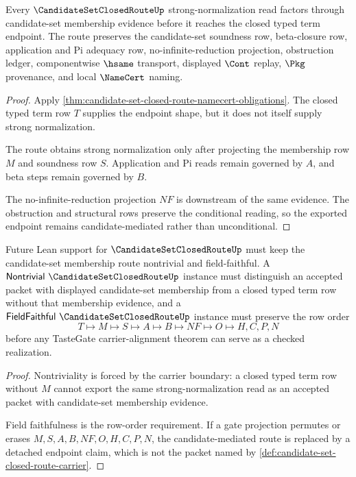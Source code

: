 \begin{theorem}
\label{thm:candidate-set-closed-route-sn}
Every $\CandidateSetClosedRouteUp$ strong-normalization read factors through candidate-set membership evidence before it reaches the closed typed term endpoint. The route preserves the candidate-set soundness row, beta-closure row, application and Pi adequacy row, no-infinite-reduction projection, obstruction ledger, componentwise $\hsame$ transport, displayed $\Cont$ replay, $\Pkg$ provenance, and local $\NameCert$ naming.
\end{theorem}
\begin{proof}
Apply \autoref{thm:candidate-set-closed-route-namecert-obligations}. The closed typed term row $T$ supplies the endpoint shape, but it does not itself supply strong normalization.

The route obtains strong normalization only after projecting the membership row $M$ and soundness row $S$. Application and Pi reads remain governed by $A$, and beta steps remain governed by $B$.

The no-infinite-reduction projection $NF$ is downstream of the same evidence. The obstruction and structural rows preserve the conditional reading, so the exported endpoint remains candidate-mediated rather than unconditional.
\end{proof}

\begin{theorem}
\label{thm:candidate-set-closed-route-tastegate-obligation}
Future Lean support for $\CandidateSetClosedRouteUp$ must keep the candidate-set membership route nontrivial and field-faithful. A $\mathsf{Nontrivial}\ \CandidateSetClosedRouteUp$ instance must distinguish an accepted packet with displayed candidate-set membership from a closed typed term row without that membership evidence, and a $\mathsf{FieldFaithful}\ \CandidateSetClosedRouteUp$ instance must preserve the row order
$$
T \longmapsto M \longmapsto S \longmapsto A \longmapsto B \longmapsto NF \longmapsto O \longmapsto H,C,P,N
$$
before any TasteGate carrier-alignment theorem can serve as a checked realization.
\end{theorem}
\begin{proof}
Nontriviality is forced by the carrier boundary: a closed typed term row without $M$ cannot export the same strong-normalization read as an accepted packet with candidate-set membership evidence.

Field faithfulness is the row-order requirement. If a gate projection permutes or erases $M,S,A,B,NF,O,H,C,P,N$, the candidate-mediated route is replaced by a detached endpoint claim, which is not the packet named by \autoref{def:candidate-set-closed-route-carrier}.
\end{proof}

